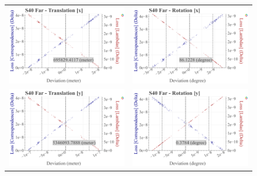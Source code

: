 \begin{figure}[!ht]
  \centering
  \begin{tabular}{cc}
    \includegraphics[width=0.45 \linewidth]{diagrams/calibration/s40_n_far/parameters.csv/Translation[x]_vs_Loss[Correspondences]_vs_Loss[Lambdas]_cluster_All.png} &
    \includegraphics[width=0.45 \linewidth]{diagrams/calibration/s40_n_far/parameters.csv/Rotation[x]_vs_Loss[Correspondences]_vs_Loss[Lambdas]_cluster_All.png} \\
    
    \includegraphics[width=0.45 \linewidth]{diagrams/calibration/s40_n_far/parameters.csv/Translation[y]_vs_Loss[Correspondences]_vs_Loss[Lambdas]_cluster_All.png} &
    \includegraphics[width=0.45 \linewidth]{diagrams/calibration/s40_n_far/parameters.csv/Rotation[y]_vs_Loss[Correspondences]_vs_Loss[Lambdas]_cluster_All.png} \\
    

\end{tabular}
\end{figure}
